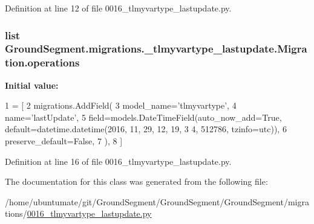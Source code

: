 Definition at line 12 of file 0016\+\_\+tlmyvartype\+\_\+lastupdate.\+py.

\hypertarget{class_ground_segment_1_1migrations_1_10016__tlmyvartype__lastupdate_1_1_migration_ab1e4253736a4fd85a59e138c7ae6e843}{}
\subsubsection[{operations}]{\setlength{\rightskip}{0pt plus 5cm}list Ground\+Segment.\+migrations.\+\_\+tlmyvartype\+\_\+lastupdate.\+Migration.\+operations\hspace{0.3cm}{\ttfamily [static]}}\label{class_ground_segment_1_1migrations_1_10016__tlmyvartype__lastupdate_1_1_migration_ab1e4253736a4fd85a59e138c7ae6e843}
{\bfseries Initial value\+:}
\begin{DoxyCode}
1 = [
2         migrations.AddField(
3             model\_name=\textcolor{stringliteral}{'tlmyvartype'},
4             name=\textcolor{stringliteral}{'lastUpdate'},
5             field=models.DateTimeField(auto\_now\_add=\textcolor{keyword}{True}, default=datetime.datetime(2016, 11, 29, 12, 19, 3
      4, 512786, tzinfo=utc)),
6             preserve\_default=\textcolor{keyword}{False},
7         ),
8     ]
\end{DoxyCode}


Definition at line 16 of file 0016\+\_\+tlmyvartype\+\_\+lastupdate.\+py.



The documentation for this class was generated from the following file\+:\begin{DoxyCompactItemize}
\item 
/home/ubuntumate/git/\+Ground\+Segment/\+Ground\+Segment/\+Ground\+Segment/migrations/\hyperlink{0016__tlmyvartype__lastupdate_8py}{0016\+\_\+tlmyvartype\+\_\+lastupdate.\+py}\end{DoxyCompactItemize}
